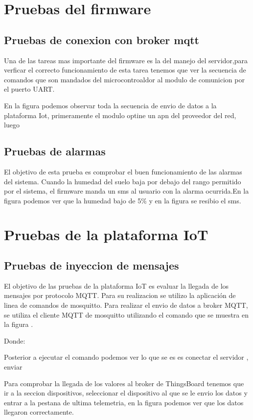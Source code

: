 \section{Pruebas del firmware}
\subsection{Pruebas de conexion con broker mqtt}
Una de las tareas mas importante del firmware es la del manejo del servidor,para verficar el correcto funcionamiento de esta tarea tenemos que ver la secuencia de comandos que son mandados del microcontroaldor al modulo de comunicion por el puerto UART.

En la figura podemos observar toda la secuencia de envio de datos a la plataforma Iot, primeramente el modulo optine un apn del proveedor del red, luego



\subsection{Pruebas de alarmas}
El objetivo de esta prueba es comprobar el buen funcionamiento de las alarmas del sistema.
Cuando la humedad del suelo baja por debajo del rango permitido por el sistema, el firmware manda un sms al usuario con la alarma ocurrida.En la figura podemos ver que la humedad bajo de 5\% y en la figura se resibio el sms.




\section{Pruebas de la plataforma IoT}
\subsection{Pruebas de inyeccion de mensajes}
El objetivo de las pruebas de la plataforma IoT es evaluar la llegada de los mensajes por protocolo MQTT.
Para su realizacion se utilizo la aplicación de linea de comandos de mosquitto.
Para realizar el envio de datos a broker MQTT, se utiliza el cliente MQTT de mosquitto utilizando el comando que se muestra en la figura .


Donde:

Posterior a ejecutar el comando podemos ver lo que se es es conectar el servidor , enviar 

Para comprobar la llegada de los valores al broker de ThingsBoard tenemos que ir a la seccion dispositivos, seleccionar el dispositivo al que se le envio los datos y entrar a la pestana de ultima telemetria, en la figura podemos ver que los datos llegaron correctamente.





\label{sec:pruebasHW}


